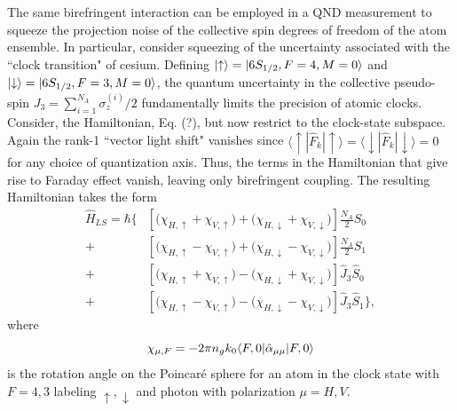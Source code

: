 \documentclass[preprint,aps,pra,onecolumn]{revtex4-1} %
\begin{document}
The same birefringent interaction can be employed in a QND measurement to squeeze the projection noise of the collective spin degrees of freedom of the atom ensemble.  In particular, consider squeezing of the uncertainty associated with the ``clock transition" of cesium.  Defining $\lvert{\uparrow}\rangle = \lvert{6S_{1/2}, F=4, M=0}\rangle$ and $\lvert{\downarrow}\rangle = \lvert{6S_{1/2}, F=3, M=0}\rangle$, the quantum uncertainty in the collective pseudo-spin $J_3 = \sum_{i=1}^{N_A} \sigma_z^{(i)}/2$ fundamentally limits the precision of atomic clocks.  Consider, the Hamiltonian, Eq. (?), but now restrict to the clock-state subspace. Again the  rank-1 ``vector light shift" vanishes since $\langle \uparrow | \hat{F}_k |\uparrow \rangle =\langle \downarrow | \hat{F}_k |\downarrow \rangle = 0$ for any choice of quantization axis. Thus, the terms in the Hamiltonian that give rise to Faraday effect vanish, leaving only birefringent coupling. The resulting Hamiltonian takes the form
\begin{align}
\hat{H}_{LS} = \hbar \Big\{ & \left[ \big( \chi_{H,\uparrow} +\chi_{V,\uparrow} \big) + \big( \chi_{H,\downarrow}+ \chi_{V,\downarrow}\big) \right] \frac{N_A}{2} \hat{S}_0 \nonumber \\
+ & \left[ \big( \chi_{H, \uparrow} - \chi_{V,\uparrow} \big) + \big(\chi_{H,\downarrow} - \chi_{V,\downarrow} \big)\right]  \frac{N_A}{2}\hat{S}_1 \nonumber \\
+ & \left[ \big( \chi_{H,\uparrow} +\chi_{V,\uparrow} \big) - \big( \chi_{H,\downarrow} + \chi_{V,\downarrow}\big) \right] \hat{J}_3 \hat{S}_0 \nonumber \\
+ & \left[  \big( \chi_{H, \uparrow} - \chi_{V,\uparrow} \big) - \big(\chi_{H,\downarrow} - \chi_{V,\downarrow} \big) \right]  \hat{J}_3 \hat{S}_1\Big\},
\end{align}
where 
\begin{equation}
\chi_{\mu,F} = - 2\pi n_g k_0 \langle{F,0}\rvert\hat{\alpha}_{\mu \mu}  \lvert{F,0}\rangle
\end{equation}
is the rotation angle on the Poincar\'{e} sphere for an atom in the clock state with $F=4,3$ labeling $\uparrow,\downarrow$ and photon with polarization $\mu = H,V$. 
\end{document}

